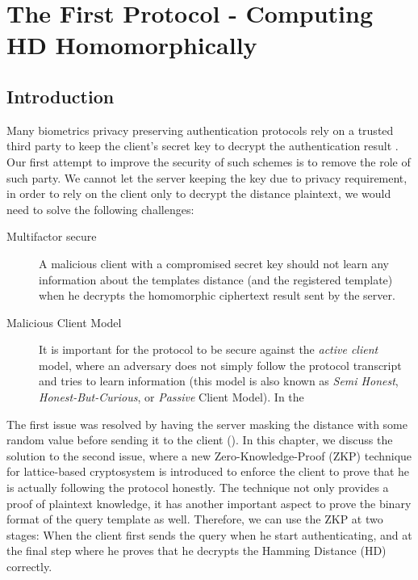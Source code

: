 \chapter{The First Protocol - Computing HD Homomorphically}
\label{chap:firstProtocol}

\ifpdf
    \graphicspath{{Chapter3/Figs/Raster/}{Chapter3/Figs/PDF/}{Chapter3/Figs/}}
\else
    \graphicspath{{Chapter3/Figs/Vector/}{Chapter3/Figs/}}
\fi

\section{Introduction}
\label{sec:firstProcIntro}
Many biometrics privacy preserving authentication protocols rely on a trusted
third party to keep the client's secret key to decrypt the authentication result
\missref{}. Our first attempt to improve the security of such schemes is to
remove the role of such party. We cannot let the server keeping the key due to
privacy requirement, in order to rely on the client only to decrypt the distance
plaintext, we would need to solve the following challenges:
\begin{description}
\item[Multifactor secure] A malicious client with a compromised secret key
  should not learn any information about the templates distance (and the
  registered template) when he decrypts the homomorphic ciphertext result sent
  by the server.
\item[Malicious Client Model] It is important for the protocol to be secure
  against the \textit{active client }model, where an adversary does not simply follow the
  protocol transcript and tries to learn information (this model is also known
  as \textit{Semi Honest}, \textit{Honest-But-Curious}, or \textit{Passive} Client Model). In the 
\end{description}

The first issue was resolved by having the server masking the distance with some
random value before sending it to the client
(\cite{mandal2015comprehensive}). In this chapter, we discuss the solution to
the second issue, where a new Zero-Knowledge-Proof (ZKP) technique for
lattice-based cryptosystem is introduced to enforce the client to prove that he
is actually following the protocol honestly. The technique not only provides a
proof of plaintext knowledge, it has another important aspect to prove the
binary format of the query template as well. Therefore, we can use the ZKP at
two stages: When the client first sends the query when he start authenticating,
and at the final step where he proves that he decrypts the Hamming Distance (HD)
correctly.


